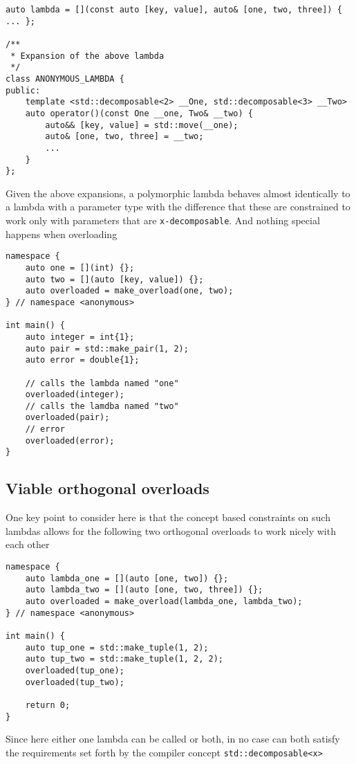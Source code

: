 \documentclass{article}
\begin{document}
\begin{lstlisting}
auto lambda = [](const auto [key, value], auto& [one, two, three]) { ... };

/**
 * Expansion of the above lambda
 */
class ANONYMOUS_LAMBDA {
public:
    template <std::decomposable<2> __One, std::decomposable<3> __Two>
    auto operator()(const One __one, Two& __two) {
        auto&& [key, value] = std::move(__one);
        auto& [one, two, three] = __two;
        ...
    }
};
\end{lstlisting}

Given the above expansions, a polymorphic lambda behaves almost identically to a
lambda with a  parameter type with the difference that these are
constrained to work only with parameters that are \texttt{x-decomposable}.
And nothing special happens when overloading

\begin{lstlisting}
namespace {
    auto one = [](int) {};
    auto two = [](auto [key, value]) {};
    auto overloaded = make_overload(one, two);
} // namespace <anonymous>

int main() {
    auto integer = int{1};
    auto pair = std::make_pair(1, 2);
    auto error = double{1};

    // calls the lambda named "one"
    overloaded(integer);
    // calls the lamdba named "two"
    overloaded(pair);
    // error
    overloaded(error);
}
\end{lstlisting}

\subsection{Viable orthogonal overloads}
One key point to consider here is that the concept based constraints on such
lambdas allows for the following two orthogonal overloads to work nicely with
each other

\begin{lstlisting}
namespace {
    auto lambda_one = [](auto [one, two]) {};
    auto lambda_two = [](auto [one, two, three]) {};
    auto overloaded = make_overload(lambda_one, lambda_two);
} // namespace <anonymous>

int main() {
    auto tup_one = std::make_tuple(1, 2);
    auto tup_two = std::make_tuple(1, 2, 2);
    overloaded(tup_one);
    overloaded(tup_two);

    return 0;
}
\end{lstlisting}

Since here either one lambda can be called or both, in no case can both
satisfy the requirements set forth by the compiler concept
\texttt{std::decomposable<x>}
\end{document}
